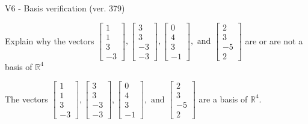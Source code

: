 \begin{exercise}
  \begin{exerciseTitle}V6 - Basis verification (ver. 379)\end{exerciseTitle}
  \begin{exerciseStatement}
    Explain why the vectors \(\left[\begin{array}{r}
1 \\
1 \\
3 \\
-3
\end{array}\right] , \left[\begin{array}{r}
3 \\
3 \\
-3 \\
-3
\end{array}\right] , \left[\begin{array}{r}
0 \\
4 \\
3 \\
-1
\end{array}\right] , \text{ and } \left[\begin{array}{r}
2 \\
3 \\
-5 \\
2
\end{array}\right]\) are or are not a basis of \(\mathbb{R}^4\)	


  \end{exerciseStatement}
  \begin{exerciseAnswer}
   The vectors \(\left[\begin{array}{r}
1 \\
1 \\
3 \\
-3
\end{array}\right] , \left[\begin{array}{r}
3 \\
3 \\
-3 \\
-3
\end{array}\right] , \left[\begin{array}{r}
0 \\
4 \\
3 \\
-1
\end{array}\right] , \text{ and } \left[\begin{array}{r}
2 \\
3 \\
-5 \\
2
\end{array}\right]\) 
  	 are  a basis of \(\mathbb{R}^4\).
  


  \end{exerciseAnswer}
\end{exercise}